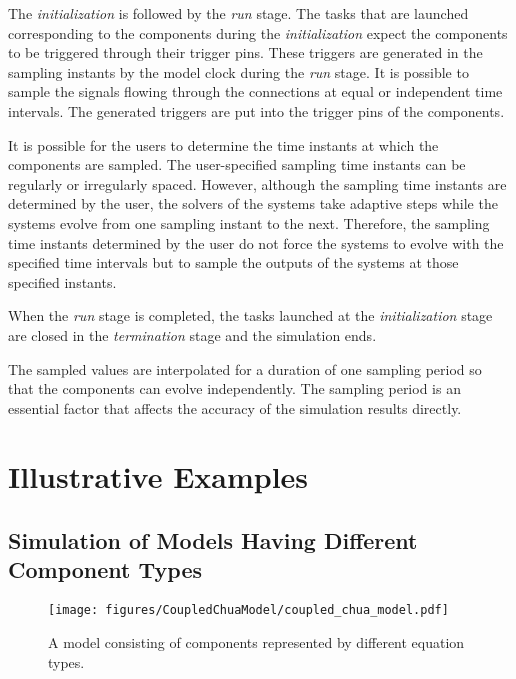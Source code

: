 \documentclass{juliacon}
\begin{document}
The \textit{initialization} is followed by the \textit{run} stage. The tasks that are launched corresponding to the components during the \textit{initialization} expect the components to be triggered through their trigger pins. These triggers are generated in the sampling instants by the model clock during the \textit{run} stage. It is possible to sample the signals flowing through the connections at equal or independent time intervals. The generated triggers are put into the trigger pins of the components.

It is possible for the users to determine the time instants at which the components are sampled. The user-specified sampling time instants can be regularly or irregularly spaced. However, although the sampling time instants are determined by the user, the solvers of the systems take adaptive steps while the systems evolve from one sampling instant to the next. Therefore, the sampling time instants determined by the user do not force the systems to evolve with the specified time intervals but to sample the outputs of the systems at those specified instants.

When the \textit{run} stage is completed, the tasks launched at the \textit{initialization} stage are closed in the \textit{termination} stage and the simulation ends.

The sampled values are interpolated for a duration of one sampling period so that the components can evolve independently. The sampling period is an essential factor that affects the accuracy of the simulation results directly.

\section{Illustrative Examples}

\subsection{Simulation of Models Having Different Component Types}
\begin{figure}
    \centering
    \texttt{[image: figures/CoupledChuaModel/coupled\_chua\_model.pdf]}
    \caption{A model consisting of components represented by different equation types.}
    \label{fig: coupled model}
\end{figure}
\end{document}
